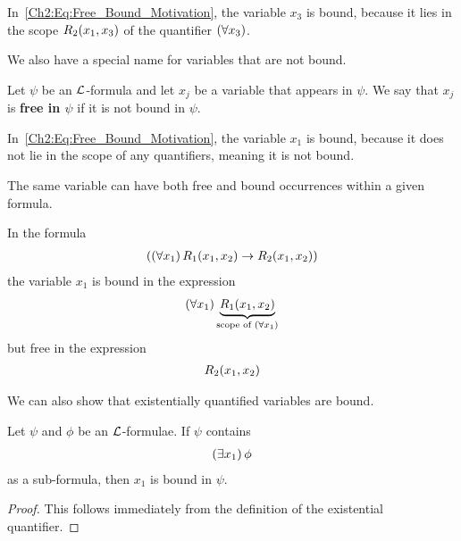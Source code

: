 \begin{boxexample}
    In~\eqref{Ch2:Eq:Free_Bound_Motivation}, the variable $x_3$ is bound, because it lies in the scope $R_2\!\left( x_1, x_3 \right)$ of the quantifier $\left( \forall x_3 \right)$.
\end{boxexample}

We also have a special name for variables that are not bound.

\begin{boxdefinition}
    Let $\psi$ be an $\mathcal{L}$-formula and let $x_j$ be a variable that appears in $\psi$. We say that $x_j$ is \textbf{free in $\psi$} if it is not bound in $\psi$.
\end{boxdefinition}

\begin{boxexample}
    In~\eqref{Ch2:Eq:Free_Bound_Motivation}, the variable $x_1$ is bound, because it does not lie in the scope of any quantifiers, meaning it is not bound.
\end{boxexample}

The same variable can have both free and bound occurrences within a given formula.

\begin{boxexample}
    In the formula
    \begin{align*}
        \left( \left( \forall x_1 \right)R_1\!\left( x_1, x_2 \right) \to R_2\!\left( x_1, x_2 \right) \right)
    \end{align*}
    the variable $x_1$ is bound in the expression
    \begin{align*}
        \left( \forall x_1 \right)\underbrace{R_1\!\left( x_1, x_2 \right)}_{\text{scope of } \left( \forall x_1 \right)}
    \end{align*}
    but free in the expression
    \begin{align*}
        R_2\!\left( x_1, x_2 \right)
    \end{align*}
\end{boxexample}

We can also show that existentially quantified variables are bound.

\begin{boxlemma}
    Let $\psi$ and $\phi$ be an $\mathcal{L}$-formulae. If $\psi$ contains
    \begin{align*}
        \left( \exists x_1 \right)\phi
    \end{align*}
    as a sub-formula, then $x_1$ is bound in $\psi$.
\end{boxlemma}
\begin{proof}
    This follows immediately from the definition of the existential quantifier. \sorry
\end{proof}

